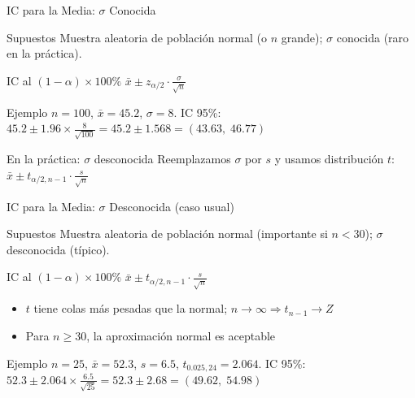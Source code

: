 \documentclass[aspectratio=169,11pt]{beamer}
\begin{document}
\begin{frame}{IC para la Media: $\sigma$ Conocida}
\small
\begin{block}{Supuestos}
Muestra aleatoria de población normal (o $n$ grande); $\sigma$ conocida (raro en la práctica).
\end{block}

\pause

\begin{block}{IC al $(1-\alpha) \times 100\%$}
$\bar{x} \pm z_{\alpha/2} \cdot \frac{\sigma}{\sqrt{n}}$
\end{block}

\pause

\begin{exampleblock}{Ejemplo}
$n = 100$, $\bar{x} = 45.2$, $\sigma = 8$. IC 95\%: $45.2 \pm 1.96 \times \frac{8}{\sqrt{100}} = 45.2 \pm 1.568 = (43.63,\; 46.77)$
\end{exampleblock}

\pause

\begin{alertblock}{En la práctica: $\sigma$ desconocida}
Reemplazamos $\sigma$ por $s$ y usamos distribución $t$: \quad $\bar{x} \pm t_{\alpha/2, n-1} \cdot \frac{s}{\sqrt{n}}$
\end{alertblock}
\end{frame}

\begin{frame}{IC para la Media: $\sigma$ Desconocida (caso usual)}
\small
\begin{block}{Supuestos}
Muestra aleatoria de población normal (importante si $n < 30$); $\sigma$ desconocida (típico).
\end{block}

\pause

\begin{block}{IC al $(1-\alpha) \times 100\%$}
$\bar{x} \pm t_{\alpha/2, n-1} \cdot \frac{s}{\sqrt{n}}$
\end{block}

\pause

\begin{itemize}\setlength{\itemsep}{0pt}
  \item $t$ tiene colas más pesadas que la normal; $n \to \infty \Rightarrow t_{n-1} \to Z$
  \pause
  \item Para $n \geq 30$, la aproximación normal es aceptable
\end{itemize}

\pause

\begin{exampleblock}{Ejemplo}
$n = 25$, $\bar{x} = 52.3$, $s = 6.5$, $t_{0.025, 24} = 2.064$. IC 95\%: $52.3 \pm 2.064 \times \frac{6.5}{\sqrt{25}} = 52.3 \pm 2.68 = (49.62,\; 54.98)$
\end{exampleblock}
\end{frame}
\end{document}
